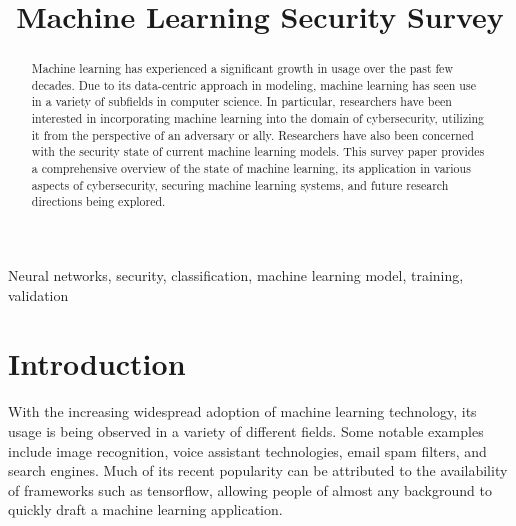 \documentclass[11pt,conference]{IEEEtran}
\begin{document}
\title{Machine Learning Security Survey \\
}

\author{
}

\maketitle

\begin{abstract}
Machine learning has experienced a significant growth in usage 
over the past few decades. Due to its data-centric approach in modeling, 
machine learning has seen use in a variety of subfields in computer science. In
particular, researchers have been interested in incorporating machine learning
into the domain of cybersecurity, utilizing it from the perspective of an
adversary or ally. Researchers have also been concerned with the security state
of current machine learning models. This survey paper provides a comprehensive overview of
the state of machine learning, its application in various aspects of
cybersecurity, securing machine learning systems, and future research directions being explored.
\end{abstract}

\begin{IEEEkeywords}
Neural networks, security, classification, machine learning model, training,
    validation
\end{IEEEkeywords}

\section{Introduction}
With the increasing widespread adoption of machine learning technology, its
usage is being observed in a variety of different fields. Some notable examples
include image recognition, voice assistant technologies, email spam filters, and search
engines. Much of its recent popularity can be attributed to the availability of
frameworks such as tensorflow, allowing people of almost any background to
quickly draft a machine learning application.
\newline
\end{document}
